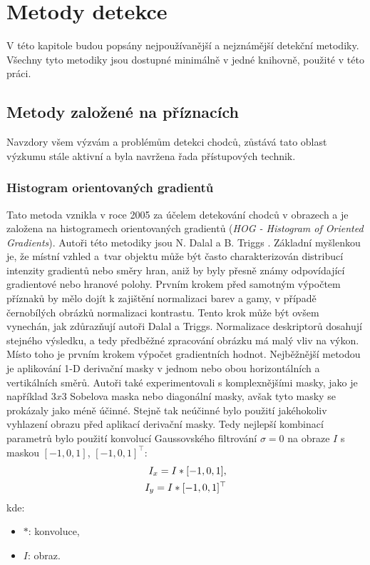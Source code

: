 \section{Metody detekce}
V této kapitole budou popsány nejpoužívanější a nejznámější detekční metodiky. Všechny tyto metodiky jsou dostupné minimálně v jedné knihovně, použité v této práci.  

\subsection{Metody založené na příznacích}
Navzdory všem výzvám a problémům detekci chodců, zůstává tato oblast výzkumu stále aktivní a byla navržena řada přístupových technik.
\subsubsection*{Histogram orientovaných gradientů}

Tato metoda vznikla v roce 2005 za účelem detekování chodců v obrazech a je založena na histogramech orientovaných gradientů (\textit{HOG - Histogram of Oriented Gradients}). Autoři této metodiky jsou N. Dalal a B. Triggs \cite{hog:dalal}. Základní myšlenkou je, že místní vzhled a~tvar objektu může být často charakterizován distribucí intenzity gradientů nebo směry hran, aniž by byly přesně známy odpovídající gradientové nebo hranové polohy.  
Prvním krokem před samotným výpočtem příznaků by mělo dojít k zajištění normalizaci barev a gamy, v případě černobílých obrázků normalizaci kontrastu. Tento krok může být ovšem vynechán, jak zdůrazňují autoři Dalal a Triggs. Normalizace deskriptorů dosahují stejného výsledku, a tedy předběžné zpracování obrázku má malý vliv na výkon. Místo toho je prvním krokem výpočet gradientních hodnot. Nejběžnější metodou je aplikování 1-D derivační masky v jednom nebo obou horizontálních a vertikálních směrů. Autoři také experimentovali s komplexnějšími masky, jako je například $3x3$ Sobelova maska nebo diagonální masky, avšak tyto masky se prokázaly jako méně účinné. Stejně tak neúčinné bylo použití jakéhokoliv vyhlazení obrazu před aplikací derivační masky. Tedy nejlepší kombinací parametrů bylo použití konvolucí Gaussovského filtrování $\sigma = 0$ na obraze $I$ s maskou $[-1, 0, 1]$, $[-1,0,1]^\top$:
\begin{equation}
\centering
 \label{eq:hogMask}
 \begin{aligned}
I_x = I * [-1, 0, 1], \\
I_y = I * [-1, 0, 1]^\top
 \end{aligned}
\end{equation}
kde:
\begin{itemize}[label=]
  \item $*$: konvoluce,
  \item $I$: obraz.
\end{itemize}

